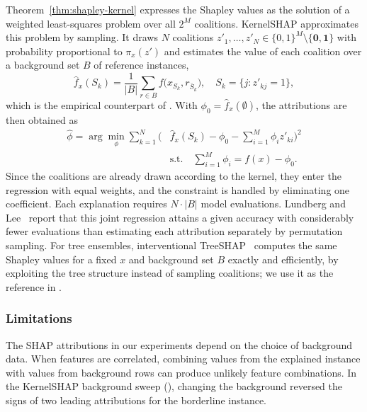     Theorem~\ref{thm:shapley-kernel} expresses the Shapley values as the solution of a weighted least-squares problem over all $2^M$ coalitions. KernelSHAP approximates this problem by sampling. It draws $N$ coalitions $z'_1, \dots, z'_N \in \{0,1\}^M \setminus \{\mathbf{0}, \mathbf{1}\}$ with probability proportional to $\pi_x(z')$ and estimates the value of each coalition over a background set $B$ of reference instances,
    \begin{equation}
        \hat{f}_x(S_k) = \frac{1}{|B|} \sum_{r \in B} f\big(x_{S_k}, r_{\bar{S}_k}\big), \quad S_k = \{ j : z'_{kj} = 1 \},
        \label{eq:kernelshap-value}
    \end{equation}
    which is the empirical counterpart of . With $\phi_0 = \hat{f}_x(\emptyset)$, the attributions are then obtained as
    \begin{equation}
        \begin{split}
            \hat{\phi} = \arg\min_{\phi} \sum_{k=1}^{N} \Big( & \hat{f}_x(S_k) - \phi_0 - \sum_{i=1}^{M} \phi_i z'_{ki} \Big)^2 \\
            & \text{s.t.} \quad \sum_{i=1}^{M} \phi_i = f(x) - \phi_0 .
        \end{split}
        \label{eq:kernelshap-regression}
    \end{equation}
    Since the coalitions are already drawn according to the kernel, they enter the regression with equal weights, and the constraint is handled by eliminating one coefficient. Each explanation requires $N \cdot |B|$ model evaluations. Lundberg and Lee~\cite{NIPS2017_8a20a862} report that this joint regression attains a given accuracy with considerably fewer evaluations than estimating each attribution separately by permutation sampling. For tree ensembles, interventional TreeSHAP~\cite{lundberg2020local} computes the same Shapley values for a fixed $x$ and background set $B$ exactly and efficiently, by exploiting the tree structure instead of sampling coalitions; we use it as the reference in .

    \subsubsection{Limitations}

    The SHAP attributions in our experiments depend on the choice of background data. When features are correlated, combining values from the explained instance with values from background rows can produce unlikely feature combinations. In the KernelSHAP background sweep (), changing the background reversed the signs of two leading attributions for the borderline instance.

